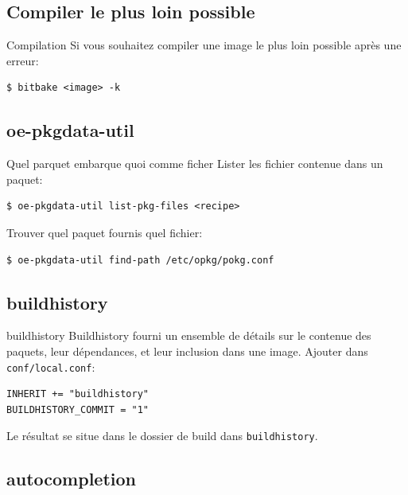 \documentclass[compress]{beamer}
\begin{document}
\subsection{Compiler le plus loin possible}

\begin{frame}[fragile]{Compilation}
Si vous souhaitez compiler une image le plus loin possible après une erreur:
\begin{lstlisting}[style=shell]
$ bitbake <image> -k
\end{lstlisting}
\end{frame}

\subsection{oe-pkgdata-util}

\begin{frame}[fragile]{Quel parquet embarque quoi comme ficher}
Lister les fichier contenue dans un paquet:
\begin{lstlisting}[style=shell]
$ oe-pkgdata-util list-pkg-files <recipe>
\end{lstlisting}
Trouver quel paquet fournis quel fichier:
\begin{lstlisting}[style=shell]
$ oe-pkgdata-util find-path /etc/opkg/pokg.conf
\end{lstlisting}
\end{frame}

\subsection{buildhistory}

\begin{frame}[fragile]{buildhistory}
Buildhistory fourni un ensemble de détails sur le contenue des paquets, leur dépendances, et leur inclusion dans une image.\newline
\newline
Ajouter dans \texttt{conf/local.conf}:
\begin{lstlisting}[style=shell]
INHERIT += "buildhistory"
BUILDHISTORY_COMMIT = "1"
\end{lstlisting}
Le résultat se situe dans le dossier de build dans \texttt{buildhistory}.
\end{frame}

\subsection{autocompletion}
\end{document}
